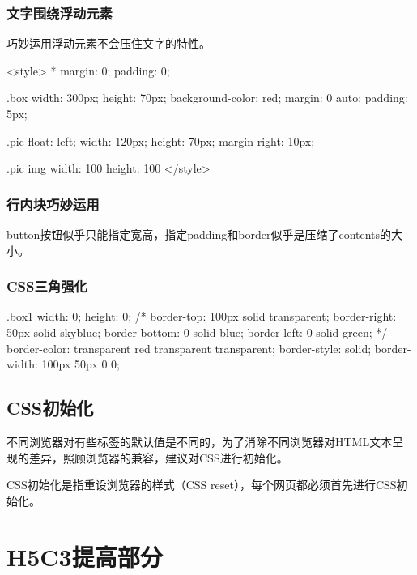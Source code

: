 \subsection{文字围绕浮动元素}
巧妙运用浮动元素不会压住文字的特性。
\begin{css}
	<style>
	* {
			margin: 0;
			padding: 0;
		}

	.box {
			width: 300px;
			height: 70px;
			background-color: red;
			margin: 0 auto;
			padding: 5px;
		}

	.pic {
			float: left;
			width: 120px;
			height: 70px;
			margin-right: 10px;
		}

	.pic img {
			width: 100%
			height: 100%
		}
	</style>
\end{css}
\subsection{行内块巧妙运用}
button按钮似乎只能指定宽高，指定padding和border似乎是压缩了contents的大小。

\subsection{CSS三角强化}
\begin{css}
	.box1 {
	width: 0;
	height: 0;
	/* border-top: 100px solid transparent;
	border-right: 50px solid skyblue;
	border-bottom: 0 solid blue;
	border-left: 0 solid green; */
	border-color: transparent red transparent transparent;
	border-style: solid;
	border-width: 100px 50px 0 0;
	}
\end{css}
\section{CSS初始化}
不同浏览器对有些标签的默认值是不同的，为了消除不同浏览器对HTML文本呈现的差异，照顾浏览器的兼容，建议对CSS进行初始化。

CSS初始化是指重设浏览器的样式（CSS reset），每个网页都必须首先进行CSS初始化。
\chapter{H5C3提高部分}